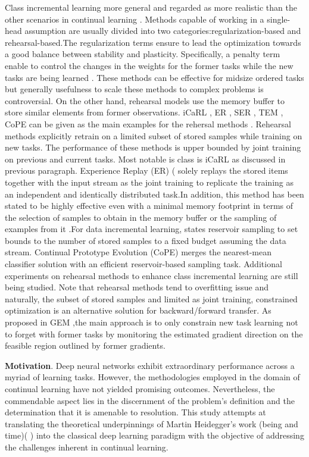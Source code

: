 \documentclass{article}
\begin{document}
Class incremental learning more general and regarded as more
realistic than the other scenarios in continual learning \cite{farquhar2018towards}. Methods capable of working in a single-head assumption are usually divided into two categories:regularization-based and rehearsal-based.The regularization terms ensure
to lead the optimization towards a good balance between stability and plasticity. Specifically, a penalty term enable to control the changes in the weights for the former tasks while the new tasks are being learned \cite{kirkpatrick2017overcoming}. These methods can be effective for midsize ordered
tasks but generally usefulness to scale these methods to complex problems is controversial. On the other hand, rehearsal models use the
memory buffer to store similar elements from former
observations. iCaRL , ER , SER , TEM , CoPE can be given as the main examples for the rehersal methods \cite{de2021continual}. Rehearsal methods explicitly retrain on
a limited subset of stored samples while training on new
tasks. The performance of these methods is upper bounded
by joint training on previous and current tasks. Most notable
is class is iCaRL as discussed in previous paragraph. 
Experience Replay (ER) (\cite{robins1995catastrophic} solely replays the stored items together with the input stream as the joint training to replicate the training as an independent and identically distributed task.In addition, this method has been stated to be highly effective even with a minimal memory footprint in terms of the selection of samples to obtain in the memory buffer or the sampling of examples from it .For data incremental learning, \cite{rolnick2019experience} states reservoir sampling to set bounds to the number of stored samples to a fixed budget assuming the data stream. Continual Prototype Evolution (CoPE) \cite{de2021continual2} merges
the nearest-mean classifier solution with an efficient
reservoir-based sampling task. Additional experiments
on rehearsal methods to enhance class incremental learning are still being studied. Note that rehearsal methods tend to overfitting issue and naturally, the subset
of stored samples and limited as joint training,
constrained optimization is an alternative solution for backward/forward transfer. As proposed in GEM \cite{lopez2017gradient},the main approach is to only constrain new task learning not to forget with former tasks by monitoring the estimated gradient direction on the feasible region outlined
by former gradients. 

\textbf{Motivation}. 
Deep neural networks exhibit extraordinary performance across a myriad of learning tasks. However, the methodologies employed in the domain of continual learning have not yielded promising outcomes. Nevertheless, the commendable aspect lies in the discernment of the problem's definition and the determination that it is amenable to resolution. This study attempts at translating the theoretical underpinnings of Martin Heidegger's work (being and time)( \cite{heidegger2010being}) into the classical deep learning paradigm with the objective of addressing the challenges inherent in continual learning.
\end{document}
